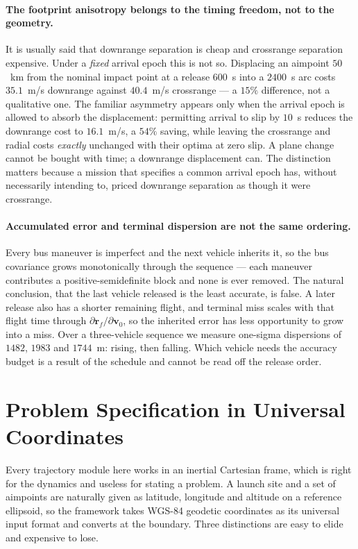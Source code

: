 \documentclass[11pt,a4paper]{article}
\theoremstyle{definition}
\numberwithin{equation}{section}
\begin{document}
\paragraph{The footprint anisotropy belongs to the timing freedom, not to the geometry.} It is usually said that downrange separation is cheap and crossrange separation expensive. Under a \emph{fixed} arrival epoch this is not so. Displacing an aimpoint $50$~km from the nominal impact point at a release $600$~s into a $2400$~s arc costs $35.1$~m/s downrange against $40.4$~m/s crossrange --- a $15\%$ difference, not a qualitative one. The familiar asymmetry appears only when the arrival epoch is allowed to absorb the displacement: permitting arrival to slip by $10$~s reduces the downrange cost to $16.1$~m/s, a $54\%$ saving, while leaving the crossrange and radial costs \emph{exactly} unchanged with their optima at zero slip. A plane change cannot be bought with time; a downrange displacement can. The distinction matters because a mission that specifies a common arrival epoch has, without necessarily intending to, priced downrange separation as though it were crossrange.

\paragraph{Accumulated error and terminal dispersion are not the same ordering.} Every bus maneuver is imperfect and the next vehicle inherits it, so the bus covariance grows monotonically through the sequence --- each maneuver contributes a positive-semidefinite block and none is ever removed. The natural conclusion, that the last vehicle released is the least accurate, is false. A later release also has a shorter remaining flight, and terminal miss scales with that flight time through $\partial \mathbf{r}_f / \partial \mathbf{v}_0$, so the inherited error has less opportunity to grow into a miss. Over a three-vehicle sequence we measure one-sigma dispersions of $1482$, $1983$ and $1744$~m: rising, then falling. Which vehicle needs the accuracy budget is a result of the schedule and cannot be read off the release order.

\section{Problem Specification in Universal Coordinates}
\label{sec:geodesy}

Every trajectory module here works in an inertial Cartesian frame, which is right for the dynamics and useless for stating a problem. A launch site and a set of aimpoints are naturally given as latitude, longitude and altitude on a reference ellipsoid, so the framework takes WGS-84 geodetic coordinates as its universal input format and converts at the boundary. Three distinctions are easy to elide and expensive to lose.
\end{document}
